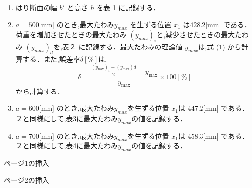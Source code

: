 \documentclass[a4paper,12pt]{jsarticle}
\begin{document}
\begin{enumerate}
  \item はり断面の幅 $b'$ と高さ $h$ を表 1 に記録する．
  \item $a = 500 $[mm] のとき,最大たわみ$y_{max}$ を生ずる位置 $x_1$ は$ 428.2 $[mm] である．
  荷重を増加させたときの最大たわみ $(y_{max})_i$と,減少させたときの最大たわみ $(y_{max})_d$を,表２
  に記録する．最大たわみの理論値 $y_{max}$は,式 (1) から計算する．また,誤差率$ \delta [\%]$は,
  \begin{equation} 
    \delta = \frac{{\frac{{(y_{\text{max}})_i + (y_{\text{max}})d}}{2} - y_{\text{max}}}}{{y_{\text{max}}}} \times 100[\%]
  \end{equation}
  から計算する．
  \item $a = 600 $[mm] のとき,最大たわみ$ y_{max}$を生ずる位置 $x_1$は $447.2 $[mm] である．
  ２と同様にして,表3に最大たわみ$y_{max}$の値を記録する．
  \item $a = 700 $[mm] のとき,最大たわみ$ y_{max}$を生ずる位置 $x_1$は $458.3 $[mm] である．
  ２と同様にして,表4に最大たわみ$y_{max}$の値を記録する．
\end{enumerate}

\clearpage
ページ1の挿入

\clearpage

ページ2の挿入
\clearpage
\end{document}
